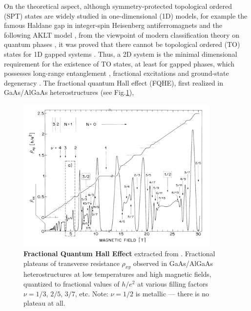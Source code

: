 On the theoretical aspect, although symmetry-protected topological ordered (SPT) states are widely studied in one-dimensional (1D) models, for example the famous Haldane gap in integer-spin Heisenberg antiferromagnets \cite{haldane1983nonlinear,haldane1983continuum} and the following AKLT model \cite{affleck2004rigorous}, from the viewpoint of modern classification theory on quantum phases \cite{wen2017colloquium,wen2002quantum}, it was proved that there cannot be topological ordered (TO) states for 1D gapped systems \cite{chen2011classification}. Thus, a 2D system is the minimal dimensional requirement for the existence of TO states, at least for gapped phases, which possesses long-range entanglement \cite{chen2010local,levin2006detecting,kitaev2006topological}, fractional excitations and ground-state degeneracy \cite{wen1990ground}. The fractional quantum Hall effect (FQHE), first realized in GaAs/AlGaAs heterostructures (see Fig.\ref{fig:FQHE}),
\begin{figure}[!htp]
    \centering
    \includegraphics[width=0.9\textwidth]{figures/Introduction/FQHE.png}
    \caption{\textbf{Fractional Quantum Hall Effect} extracted from \cite{stormer1999fractional}. Fractional plateaus of transverse resistance $\rho_{xy}$ observed in GaAs/AlGaAs heterostructures at low temperatures and high magnetic fields, quantized to fractional values of $h/e^2$ at various filling factors $\nu=1/3$, $2/5$, $3/7$, etc. Note: $\nu=1/2$ is metallic --- there is no plateau at all.}
    \label{fig:FQHE}
\end{figure}
